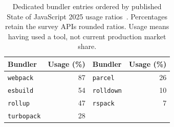 \begin{table}[t]
\caption{Dedicated bundler entries ordered by published State of JavaScript 2025 usage ratios~\cite{stateofjs2025}. Percentages retain the survey API\textquotesingle s rounded ratios. Usage means having used a tool, not current production market share.}
\label{tab:bundler-usage}
\centering\small
\begin{tabular}{lr@{\qquad}lr}
\toprule
Bundler & Usage (\%) & Bundler & Usage (\%)\\
\midrule
\nolinkurl{webpack} & 87 & \nolinkurl{parcel} & 26\\
\nolinkurl{esbuild} & 54 & \nolinkurl{rolldown} & 10\\
\nolinkurl{rollup} & 47 & \nolinkurl{rspack} & 7\\
\nolinkurl{turbopack} & 28 &  & \\
\bottomrule
\end{tabular}
\end{table}
